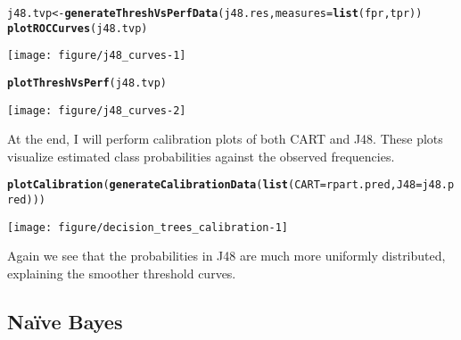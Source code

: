 \documentclass{article}\usepackage[]{graphicx}\usepackage[]{color}
\makeatletter
\def\maxwidth{ %
  \ifdim\Gin@nat@width>\linewidth
    \linewidth
  \else
    \Gin@nat@width
  \fi
}
\newcommand{\hlstd}[1]{\textcolor[rgb]{0.345,0.345,0.345}{#1}}%
\newcommand{\hlkwb}[1]{\textcolor[rgb]{0.69,0.353,0.396}{#1}}%
\newcommand{\hlkwc}[1]{\textcolor[rgb]{0.333,0.667,0.333}{#1}}%
\newcommand{\hlkwd}[1]{\textcolor[rgb]{0.737,0.353,0.396}{\textbf{#1}}}%
\newenvironment{kframe}{%
 \def\at@end@of@kframe{}%
 \ifinner\ifhmode%
  \def\at@end@of@kframe{\end{minipage}}%
  \begin{minipage}{\columnwidth}%
 \fi\fi%
 \def\FrameCommand##1{\hskip\@totalleftmargin \hskip-\fboxsep
 \colorbox{shadecolor}{##1}\hskip-\fboxsep
     \hskip-\linewidth \hskip-\@totalleftmargin \hskip\columnwidth}%
 \MakeFramed {\advance\hsize-\width
   \@totalleftmargin\z@ \linewidth\hsize
   \@setminipage}}%
 {\par\unskip\endMakeFramed%
 \at@end@of@kframe}
\newenvironment{knitrout}{}{} %
\makeatother
\begin{document}
\begin{knitrout}
\color{fgcolor}\begin{kframe}
\begin{alltt}
\hlstd{j48.tvp} \hlkwb{<-} \hlkwd{generateThreshVsPerfData}\hlstd{(j48.res,} \hlkwc{measures}\hlstd{=}\hlkwd{list}\hlstd{(fpr, tpr))}
\hlkwd{plotROCCurves}\hlstd{(j48.tvp)}
\end{alltt}
\end{kframe}

{\centering \texttt{[image: figure/j48\_curves-1]} 

}


\begin{kframe}\begin{alltt}
\hlkwd{plotThreshVsPerf}\hlstd{(j48.tvp)}
\end{alltt}
\end{kframe}

{\centering \texttt{[image: figure/j48\_curves-2]} 

}



\end{knitrout}

At the end, I will perform calibration plots of both CART and J48.  These plots
visualize estimated class probabilities against the observed frequencies.

\begin{knitrout}
\color{fgcolor}\begin{kframe}
\begin{alltt}
\hlkwd{plotCalibration}\hlstd{(}\hlkwd{generateCalibrationData}\hlstd{(}\hlkwd{list}\hlstd{(}\hlkwc{CART}\hlstd{=rpart.pred,} \hlkwc{J48}\hlstd{=j48.pred)))}
\end{alltt}
\end{kframe}

{\centering \texttt{[image: figure/decision\_trees\_calibration-1]} 

}



\end{knitrout}

Again we see that the probabilities in J48 are much more uniformly distributed,
explaining the smoother threshold curves.

\subsection{Naïve Bayes}
\end{document}
